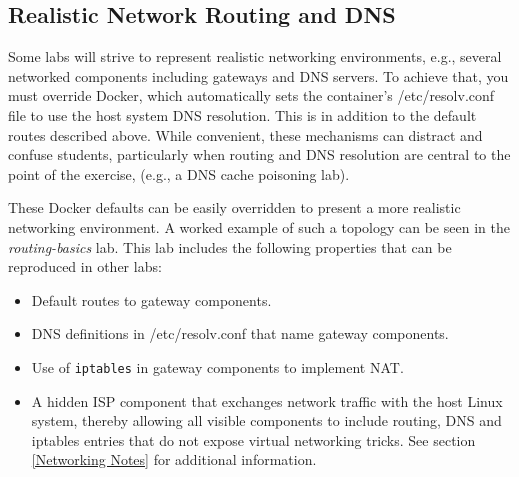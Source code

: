 \documentclass[12pt]{article}
\begin{document}
\subsection{Realistic Network Routing and DNS}
Some labs will strive to represent realistic networking environments, 
e.g., several networked components including gateways and DNS servers.
To achieve that, you must override Docker, which automatically sets 
the container's /etc/resolv.conf file to use the
host system DNS resolution.  This is in addition to the default routes described
above.  While convenient, these mechanisms can distract and confuse students, particularly
when routing and DNS resolution are central to the point of the exercise, (e.g.,
a DNS cache poisoning lab).

These Docker defaults can be easily overridden to present a more realistic networking
environment.  A worked example of such a topology can be seen in the \textit{routing-basics} lab.
This lab includes the following properties that can be reproduced in other labs:
\begin{itemize}
\item Default routes to gateway components.
\item DNS definitions in /etc/resolv.conf that name gateway components.
\item Use of \texttt{iptables} in gateway components to implement NAT.
\item A hidden ISP component that exchanges network traffic with the host Linux system,
thereby allowing all visible components to include routing, DNS and iptables entries that do not
expose virtual networking tricks.  See section \ref{Networking Notes} for additional information.

\end{itemize}
\end{document}
